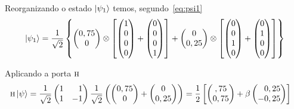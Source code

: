 Reorganizando o estado $\ket{\psi_1}$ temos, segundo~\eqref{eq:psi1}
\begin{equation}
\ket{\psi_1} = \frac{1}{\sqrt{2}} \left\{ \begin{pmatrix}
0,75 \\
0
\end{pmatrix} \otimes \left[ \begin{pmatrix}
1 \\
0 \\
0 \\
0
\end{pmatrix} + \begin{pmatrix}
0 \\
0 \\
0 \\
1
\end{pmatrix}\right] +  \begin{pmatrix}
0 \\
0,25
\end{pmatrix} \otimes \left[ \begin{pmatrix}
0 \\
0 \\
1 \\
0
\end{pmatrix} + \begin{pmatrix}
0 \\
1 \\
0 \\
0
\end{pmatrix}\right] \right\}
\end{equation}	

Aplicando a porta \(\operatorname{\textsc{h}}\)
\begin{equation}
\begin{split}
		\HAD \ket{\psi} &= \frac{1}{\sqrt{2}} \begin{pmatrix*}[r]
		1 & 1 \\
		1 & -1
		\end{pmatrix*} \frac{1}{\sqrt{2}}\left( \begin{pmatrix}
		0,75 \\
		0 
		\end{pmatrix} +  \begin{pmatrix}
		0 \\
		0,25
		\end{pmatrix} \right) = \frac{1}{2} \left[ \begin{pmatrix}
		,75 \\
		0,75 
		\end{pmatrix} + \beta \begin{pmatrix*}[r]
		0,25 \\
		-0,25
		\end{pmatrix*} \right]
  	\end{split}
\end{equation}	

